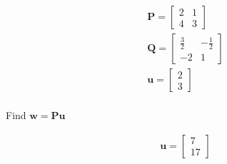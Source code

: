 \begin{align*}
    \boldsymbol{P} = \begin{bmatrix}
        2 & 1 \\
        4 & 3
    \end{bmatrix} \\
    \boldsymbol{Q} = \begin{bmatrix}
        \frac{3}{2} & -\frac{1}{2} \\
        -2 & 1
    \end{bmatrix} \\
    \boldsymbol{u} = \begin{bmatrix}
        2 \\ 3
    \end{bmatrix} \\
\end{align*}

Find $\boldsymbol{w} = \boldsymbol{Pu}$

\begin{solution}
\begin{align*}
    \boldsymbol{u} = \begin{bmatrix}
        7 \\ 17
    \end{bmatrix}
\end{align*}
\end{solution}
